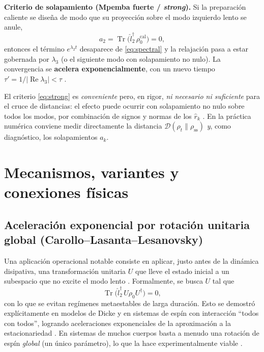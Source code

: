 \documentclass[11pt,a4paper]{article}
\theoremstyle{definition}
\theoremstyle{plain}
\newcommand{\Dop}{\mathcal{D}}
\newcommand{\rss}{\rho_{\mathrm{ss}}}
\renewcommand{\Tr}{\operatorname{Tr}}
\begin{document}
\begin{cajaclave}
\textbf{Criterio de solapamiento (Mpemba fuerte / \emph{strong}).} Si la preparación caliente se diseña de
modo que su proyección sobre el modo izquierdo lento se anule,
\begin{equation}
a_2=\Tr\!\big(\hat l_2^{\dagger}\,\rho^{\mathrm{cal}}_0\big)=0,
\label{eq:strong}
\end{equation}
entonces el término $e^{\lambda_2 t}$ desaparece de \eqref{eq:spectral} y la relajación pasa a estar
gobernada por $\lambda_3$ (o el siguiente modo con solapamiento no nulo). La convergencia se
\textbf{acelera exponencialmente}, con un nuevo tiempo $\tau'=1/|\operatorname{Re}\lambda_3|<\tau$
\cite{Carollo2021,Zhang2025}.
\end{cajaclave}

\noindent
El criterio \eqref{eq:strong} es \emph{conveniente} pero, en rigor, \emph{ni necesario ni suficiente} para
el cruce de distancias: el efecto puede ocurrir con solapamiento no nulo sobre todos los modos, por
combinación de signos y normas de los $\hat r_k$ \cite{LiYang2026}. En la práctica numérica conviene medir
directamente la distancia $\Dop(\rho_t\|\rss)$ \emph{y}, como diagnóstico, los solapamientos
$a_k$.

\section{Mecanismos, variantes y conexiones físicas}

\subsection{Aceleración exponencial por rotación unitaria global (Carollo--Lasanta--Lesanovsky)}

Una aplicación operacional notable consiste en aplicar, justo antes de la dinámica disipativa, una
transformación unitaria $U$ que lleve el estado inicial a un subespacio que no excite el modo lento
\cite{Carollo2021,Kochsiek2022}. Formalmente, se busca $U$ tal que
\begin{equation}
\Tr\!\big(\hat l_2^{\dagger}\,U\rho_0 U^{\dagger}\big)=0,
\end{equation}
con lo que se evitan regímenes metaestables de larga duración. Esto se demostró explícitamente en modelos
de Dicke y en sistemas de espín con interacción ``todos con todos'', logrando aceleraciones exponenciales
de la aproximación a la estacionariedad \cite{Carollo2021}. En sistemas de muchos cuerpos basta a menudo una
rotación de espín \emph{global} (un único parámetro), lo que la hace experimentalmente viable
\cite{Kochsiek2022}.
\end{document}
